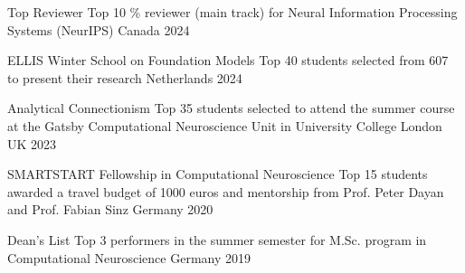



\begin{cvhonors}


    \cvhonor
    {Top Reviewer} %
    {Top 10 \% reviewer (main track) for Neural Information Processing Systems (NeurIPS)} %
    {Canada} %
    {2024} %

    
    \cvhonor
    {ELLIS Winter School on Foundation Models} %
    {Top 40 students selected from 607 to present their research} %
    {Netherlands} %
    {2024} %
    
    \cvhonor
    {Analytical Connectionism} %
    {Top 35 students selected to attend the summer course at the Gatsby Computational Neuroscience Unit in University College London} %
    {UK} %
    {2023} %

    
    \cvhonor
    {SMARTSTART Fellowship in Computational Neuroscience} %
    {Top 15 students awarded a travel budget of 1000 euros and mentorship from Prof. Peter Dayan and Prof. Fabian Sinz} %
    {Germany} %
    {2020} %
    
  \cvhonor
    {Dean's List} %
    {Top 3 performers in the summer semester for M.Sc. program in Computational Neuroscience} %
    {Germany} %
    {2019} %


\end{cvhonors}
